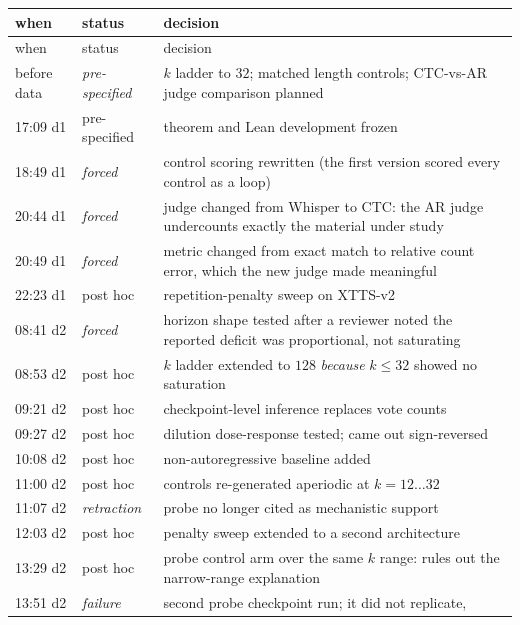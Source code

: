 \documentclass[11pt]{article}
\begin{document}
\begin{longtable}{llp{4.6cm}}
\toprule
when & status & decision \\
\midrule
\endfirsthead
\toprule
when & status & decision \\
\midrule
\endhead
before data & \emph{pre-specified} & $k$ ladder to $32$; matched length controls;
  CTC-vs-AR judge comparison planned \\
\midrule
17:09 d1 & pre-specified & theorem and Lean development frozen \\
18:49 d1 & \emph{forced} & control scoring rewritten (the first version scored
  every control as a loop) \\
20:44 d1 & \emph{forced} & judge changed from Whisper to CTC: the AR judge
  undercounts exactly the material under study \\
20:49 d1 & \emph{forced} & metric changed from exact match to relative count
  error, which the new judge made meaningful \\
22:23 d1 & post hoc & repetition-penalty sweep on XTTS-v2 \\
08:41 d2 & \emph{forced} & horizon shape tested after a reviewer noted the
  reported deficit was proportional, not saturating \\
08:53 d2 & post hoc & $k$ ladder extended to $128$ \emph{because} $k\le32$ showed
  no saturation \\
09:21 d2 & post hoc & checkpoint-level inference replaces vote counts \\
09:27 d2 & post hoc & dilution dose-response tested; came out sign-reversed \\
10:08 d2 & post hoc & non-autoregressive baseline added \\
11:00 d2 & post hoc & controls re-generated aperiodic at $k=12\ldots32$ \\
11:07 d2 & \emph{retraction} & probe no longer cited as mechanistic support \\
12:03 d2 & post hoc & penalty sweep extended to a second architecture \\
13:29 d2 & post hoc & probe control arm over the same $k$ range: rules out the
  narrow-range explanation \\
13:51 d2 & \emph{failure} & second probe checkpoint run; it did not replicate,

\end{longtable}
\end{document}
